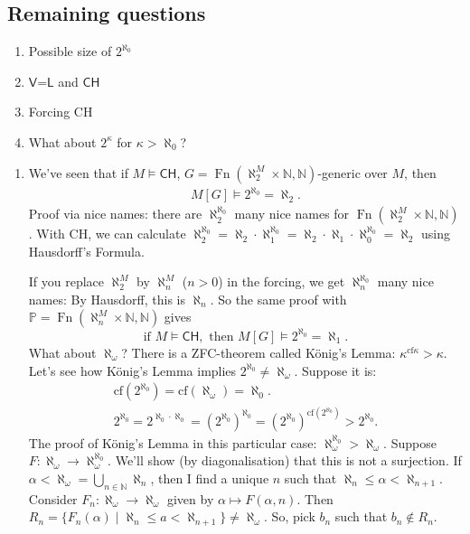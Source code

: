 \documentclass{article}
\newcommand{\p}{\mathbb{P}}
\newcommand{\1}{\mathbbm{1}}
\let\models\vDash
\begin{document}
\subsection{Remaining questions}
\newlec
\begin{enumerate}
  \item Possible size of $2^{\aleph_0}$
  \item $\textsf{V=L}$ and $\textsf{CH}$
  \item Forcing \textsf{CH}
  \item What about $2^\kappa$ for $\kappa > \aleph_0$?
\end{enumerate}
\begin{enumerate}
  \item We've seen that if $M \models \textsf{CH}$, $G = \operatorname{Fn}(\aleph_2^M \times \mathbb{N}, \mathbb{N})$-generic over $M$, then
    \begin{align*}
      M[G] \models 2^{\aleph_0} = \aleph_2.
    \end{align*}
    Proof via nice names: there are $\aleph_2^{\aleph_0}$ many nice names for $\operatorname{Fn}(\aleph_2^M \times \mathbb{N}, \mathbb{N})$.
    With \textsf{CH}, we can calculate $\aleph_2^{\aleph_0} = \aleph_2 \cdot \aleph_1^{\aleph_0} = \aleph_2 \cdot \aleph_1 \cdot \aleph_0^{\aleph_0} = \aleph_2$ using Hausdorff's Formula.

    If you replace $\aleph_2^M$ by $\aleph_n^M$ ($n > 0$) in the forcing, we get $\aleph_n^{\aleph_0}$ many nice names: By Hausdorff, this is $\aleph_n$.
    So the same proof with $\p = \operatorname{Fn}(\aleph_n^M \times \mathbb{N}, \mathbb{N})$ gives
    \begin{equation*}
      \text{if } M \models \textsf{CH}, \text{ then } M[G] \models 2^{\aleph_0} = \aleph_1.
    \end{equation*}
    What about $\aleph_\omega$?
    There is a \textsf{ZFC}-theorem called K\"onig's Lemma: $\kappa^{\text{cf} \kappa} > \kappa$.
    Let's see how K\"onig's Lemma implies $2^{\aleph_0} \neq \aleph_\omega$.
    Suppose it is:
    \begin{gather*}
      \text{cf}(2^{\aleph_0}) = \text{cf}(\aleph_\omega) = \aleph_0. \\
      2^{\aleph_0} = 2^{\aleph_0 \cdot \aleph_0} = (2^{\aleph_0})^{\aleph_0} = (2^{\aleph_0})^{\text{cf}(2^{\aleph_0})} > 2^{\aleph_0}.
    \end{gather*}
    The proof of K\"onig's Lemma in this particular case: $\aleph_\omega^{\aleph_0} > \aleph_\omega$.
    Suppose $F: \aleph_\omega \to \aleph_\omega^{\aleph_0}$. We'll show (by diagonalisation) that this is not a surjection.
    If $\alpha < \aleph_\omega = \bigcup_{n \in \mathbb{N}} \aleph_n$, then I find a unique $n$ such that $\aleph_n \leq \alpha < \aleph_{n+1}$.
    Consider $F_n: \aleph_\omega \to \aleph_\omega$ given by $\alpha \mapsto F(\alpha,n)$.
    Then $R_n = \{F_n(\alpha) \mid \aleph_n \leq a < \aleph_{n+1}\} \neq \aleph_\omega$.
    So, pick $b_n$ such that $b_n \notin R_n$.


\end{enumerate}
\end{document}
